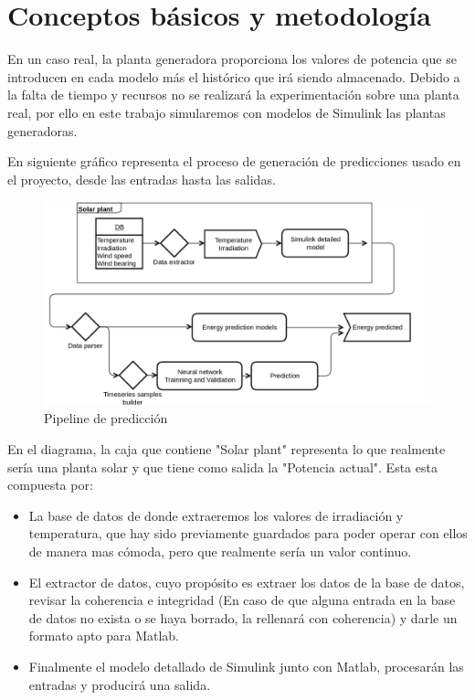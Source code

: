 \chapter{Conceptos básicos y metodología}



En un caso real, la planta generadora proporciona los valores de potencia que se introducen en cada modelo más el histórico que irá siendo almacenado. Debido a la falta de tiempo y recursos no se realizará la experimentación sobre una planta real, por ello en este trabajo simularemos con modelos de Simulink las plantas generadoras. 

En siguiente gráfico representa el proceso de generación de predicciones usado en el proyecto, desde las entradas hasta las salidas.

\begin{figure}[h]
    \includegraphics[width=\textwidth]{graphs/full-pipeline.png}
    \caption{Pipeline de predicción}
    \label{fig:full_pipeline}
\end{figure}

En el diagrama, la caja que contiene "Solar plant" representa lo que realmente sería una planta solar y que tiene como salida la "Potencia actual". Esta esta compuesta por:

\begin{itemize}
	\item La base de datos de donde extraeremos los valores de irradiación y temperatura, que hay sido previamente guardados para poder operar con ellos de manera mas cómoda, pero que realmente sería un valor continuo.
	\item El extractor de datos, cuyo propósito es extraer los datos de la base de datos, revisar la coherencia e integridad (En caso de que alguna entrada en la base de datos no exista o se haya borrado, la rellenará con coherencia) y darle un formato apto para Matlab.
	\item Finalmente el modelo detallado de Simulink junto con Matlab, procesarán las entradas y producirá una salida.
\end{itemize}

